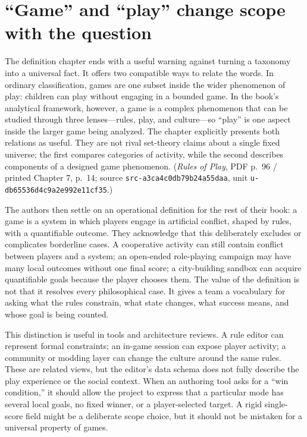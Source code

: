 \section{``Game'' and ``play'' change scope with the question}\label{06-engine-ii-ch047-game-and-play-change-scope-with-the-question}

The definition chapter ends with a useful warning against turning a taxonomy into a universal fact. It offers two compatible ways to relate the words. In ordinary classification, games are one subset inside the wider phenomenon of play: children can play without engaging in a bounded game. In the book's analytical framework, however, a game is a complex phenomenon that can be studied through three lenses---rules, play, and culture---so ``play'' is one aspect inside the larger game being analyzed. The chapter explicitly presents both relations as useful. They are not rival set-theory claims about a single fixed universe; the first compares categories of activity, while the second describes components of a designed game phenomenon. (\emph{Rules of Play}, PDF p.~96 / printed Chapter 7, p.~14; source \texttt{src-a3ca4c0db79b24a55daa}, unit \texttt{u-db65536d4c9a2e992e11cf35}.)

The authors then settle on an operational definition for the rest of their book: a game is a system in which players engage in artificial conflict, shaped by rules, with a quantifiable outcome. They acknowledge that this deliberately excludes or complicates borderline cases. A cooperative activity can still contain conflict between players and a system; an open-ended role-playing campaign may have many local outcomes without one final score; a city-building sandbox can acquire quantifiable goals because the player chooses them. The value of the definition is not that it resolves every philosophical case. It gives a team a vocabulary for asking what the rules constrain, what state changes, what success means, and whose goal is being counted.

This distinction is useful in tools and architecture reviews. A rule editor can represent formal constraints; an in-game session can expose player activity; a community or modding layer can change the culture around the same rules. These are related views, but the editor's data schema does not fully describe the play experience or the social context. When an authoring tool asks for a ``win condition,'' it should allow the project to express that a particular mode has several local goals, no fixed winner, or a player-selected target. A rigid single-score field might be a deliberate scope choice, but it should not be mistaken for a universal property of games.

